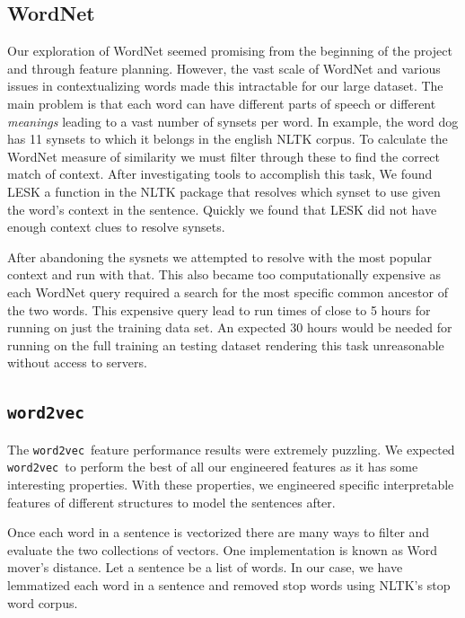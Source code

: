 \documentclass{article} %
\newcommand{\wordtvec}{\texttt{word2vec}}
\begin{document}
\subsection{WordNet} \label{sub:wnet_res}
Our exploration of WordNet seemed promising from the beginning of the project and through feature planning. However, the vast scale of WordNet and various issues in contextualizing words made this intractable for our large dataset. The main problem is that each word can have different parts of speech or different \textit{meanings} leading to a vast number of synsets per word. In example, the word dog has 11 synsets to which it belongs in the english NLTK corpus. To calculate the WordNet measure of similarity we must filter through these to find the correct match of context. After investigating tools to accomplish this task, We found LESK a function in the NLTK package that resolves which synset to use given the word's context in the sentence. Quickly we found that LESK did not have enough context clues to resolve synsets.

After abandoning the sysnets we attempted to resolve with the most popular context and run with that. This also became too computationally expensive as each WordNet query required a search for the most specific common ancestor of the two words. This expensive query lead to run times of close to 5 hours for running on just the training data set. An expected 30 hours would be needed for running on the full training an testing dataset rendering this task unreasonable without access to servers.

\subsection{\wordtvec}
The \wordtvec\ feature performance results were extremely puzzling. We expected \wordtvec\ to perform the best of all our engineered features as it has some interesting properties. With these properties, we engineered specific interpretable features of different structures to model the sentences after.

Once each word in a sentence is vectorized there are many ways to filter and evaluate the two collections of vectors. One implementation is known as Word mover's distance. Let a sentence be a list of words. In our case, we have lemmatized each word in a sentence and removed stop words using NLTK's stop word corpus. 
\end{document}
